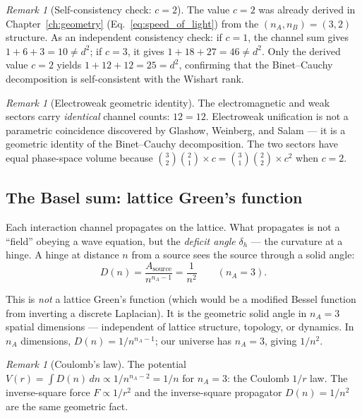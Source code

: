 \documentclass[12pt]{article}
\theoremstyle{remark}
\newtheorem{remark}[theorem]{Remark}
\theoremstyle{definition}
\begin{document}
\begin{remark}[Self-consistency check: $c = 2$]
The value $c = 2$ was already derived in Chapter~\ref{ch:geometry} (Eq.~\ref{eq:speed_of_light}) from the $(n_A, n_B) = (3, 2)$ structure. As an independent consistency check: if $c = 1$, the channel sum gives $1 + 6 + 3 = 10 \neq d^2$; if $c = 3$, it gives $1 + 18 + 27 = 46 \neq d^2$. Only the derived value $c = 2$ yields $1 + 12 + 12 = 25 = d^2$, confirming that the Binet--Cauchy decomposition is self-consistent with the Wishart rank.
\end{remark}

\begin{remark}[Electroweak geometric identity]
The electromagnetic and weak sectors carry \emph{identical} channel counts: $12 = 12$. Electroweak unification is not a parametric coincidence discovered by Glashow, Weinberg, and Salam --- it is a geometric identity of the Binet--Cauchy decomposition. The two sectors have equal phase-space volume because $\binom{3}{2}\binom{2}{1} \times c = \binom{3}{1}\binom{2}{2} \times c^2$ when $c = 2$.
\end{remark}

\subsection{The Basel sum: lattice Green's function}

Each interaction channel propagates on the lattice. What propagates is not a ``field'' obeying a wave equation, but the \emph{deficit angle} $\delta_h$ --- the curvature at a hinge. A hinge at distance $n$ from a source sees the source through a solid angle:
\begin{equation}
D(n) = \frac{A_\text{source}}{n^{n_A - 1}} = \frac{1}{n^2} \qquad (n_A = 3).
\end{equation}

This is \emph{not} a lattice Green's function (which would be a modified Bessel function from inverting a discrete Laplacian). It is the geometric solid angle in $n_A = 3$ spatial dimensions --- independent of lattice structure, topology, or dynamics. In $n_A$ dimensions, $D(n) = 1/n^{n_A-1}$; our universe has $n_A = 3$, giving $1/n^2$.

\begin{remark}[Coulomb's law]
The potential $V(r) = \int D(n)\,dn \propto 1/n^{n_A-2} = 1/n$ for $n_A = 3$: the Coulomb $1/r$ law. The inverse-square force $F \propto 1/r^2$ and the inverse-square propagator $D(n) = 1/n^2$ are the same geometric fact.
\end{remark}
\end{document}
